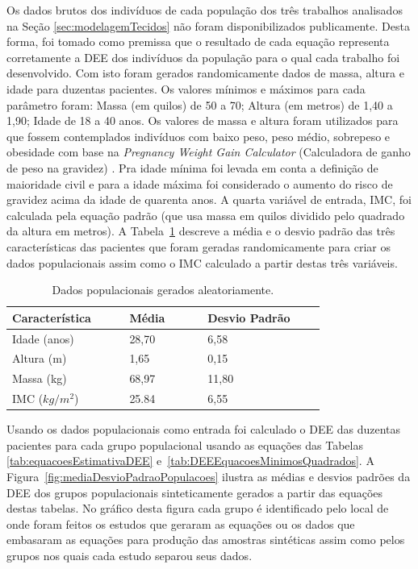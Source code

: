 Os dados brutos dos indivíduos de cada população dos três trabalhos analisados na Seção \ref{sec:modelagemTecidos} não foram disponibilizados publicamente. Desta forma, foi tomado como premissa que o resultado de cada equação representa corretamente a \acrshort{DEE} dos indivíduos da população para o qual cada trabalho foi desenvolvido. Com isto foram gerados randomicamente dados de massa, altura e idade para duzentas pacientes. Os valores mínimos e máximos para cada parâmetro foram: Massa (em quilos) de 50 a 70; Altura (em metros) de 1,40 a 1,90; Idade de 18 a 40 anos. Os valores de massa e altura foram utilizados para que fossem contemplados indivíduos com baixo peso, peso médio, sobrepeso e obesidade com base na \textit{Pregnancy Weight Gain Calculator} (Calculadora de ganho de peso na gravidez) \cite{MTILLC2019}. Pra idade mínima foi levada em conta a definição de maioridade civil e para a idade máxima foi considerado o aumento do risco de gravidez acima da idade de quarenta anos. A quarta variável de entrada, \acrshort{IMC}, foi calculada pela equação padrão (que usa massa em quilos dividido pelo quadrado da altura em metros).  A Tabela~\ref{tab:DadosPopulacaoGerada} descreve a média e o desvio padrão das três características das pacientes que foram geradas randomicamente para criar os dados populacionais assim como o \acrshort{IMC} calculado a partir destas três variáveis. 

\begin{table}[!ht]
\begin{center}
\caption{Dados populacionais gerados aleatoriamente.}
\label{tab:DadosPopulacaoGerada}
\begin{tabular}{|p{0.3\linewidth}|p{0.2\linewidth}|p{0.3\linewidth}|}
\hline
\textbf{Característica} & \textbf{Média} & \textbf{Desvio Padrão}\\
\hline\hline
Idade (anos) & 28,70 & 6,58\\
Altura (m) & 1,65 & 0,15\\
Massa (kg) & 68,97 & 11,80\\
IMC ($kg/m^2$) & 25.84 & 6,55\\
\hline
\end{tabular}
\end{center}
\end{table}

Usando os dados populacionais como entrada foi calculado o \acrshort{DEE} das duzentas pacientes para cada grupo populacional usando as equações das Tabelas \ref{tab:equacoesEstimativaDEE} e~\ref{tab:DEEEquacoesMinimosQuadrados}. A Figura~\ref{fig:mediaDesvioPadraoPopulacoes} ilustra as médias e desvios padrões da \acrshort{DEE} dos grupos populacionais sinteticamente gerados a partir das equações destas tabelas. No gráfico desta figura cada grupo é identificado pelo local de onde  foram feitos os estudos que geraram as equações ou os dados que embasaram as equações para produção das amostras sintéticas assim como pelos grupos nos quais cada estudo separou seus dados.

